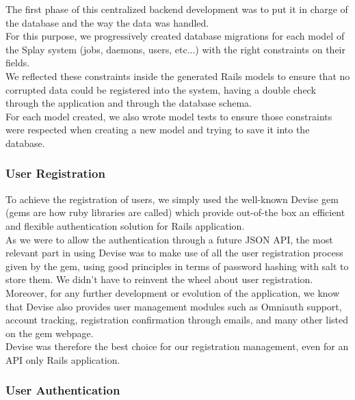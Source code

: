 \documentclass{eplmastersthesis}
\begin{document}
          The first phase of this centralized backend development was to
          put it in charge of the database and the way the data was handled.\\

          For this purpose, we progressively created database migrations
          for each model of the Splay system (jobs, daemons, users, etc...)
          with the right constraints on their fields.\\
          We reflected these constraints inside the generated Rails models to
          ensure that no corrupted data could be registered into the system,
          having a double check through the application and through the
          database schema.\\
          For each model created, we also wrote model tests to ensure those
          constraints were respected when creating a new model and trying
          to save it into the database.

        \subsubsection{User Registration}

          To achieve the registration of users, we simply used the
          well-known Devise \cite{devise} gem (gems are how ruby libraries are
          called) which provide out-of-the box an efficient and flexible
          authentication solution for Rails application.\\
          As we were to allow the authentication through a future JSON API,
          the most relevant part in using Devise was to make use of all
          the user registration process given by the gem, using good principles
          in terms of password hashing with salt to store them. We didn't
          have to reinvent the wheel about user registration.\\

          Moreover, for any further development or evolution of the application,
          we know that Devise also provides user management modules such as
          Omniauth support, account tracking, registration confirmation
          through emails, and many other listed on the gem webpage.\\

          Devise was therefore the best choice for our registration management,
          even for an API only Rails application.

        \subsubsection{User Authentication}
\end{document}
